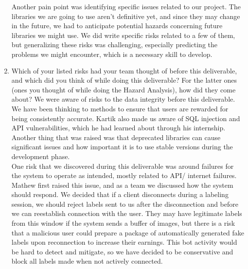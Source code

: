 \documentclass{article}
\begin{document}
\begin{enumerate}
    Another pain point was identifying specific issues related to our project. The libraries we are going to use aren’t definitive yet, and since they may change in the future, 
    we had to anticipate potential hazards concerning future libraries we might use. We did write specific risks related to a few of them, 
    but generalizing these risks was challenging, especially predicting the problems we might encounter, which is a necessary skill to develop.
    

    \item Which of your listed risks had your team thought of before this
    deliverable, and which did you think of while doing this deliverable? For
    the latter ones (ones you thought of while doing the Hazard Analysis), how
    did they come about?
    We were aware of risks to the data integrity before this deliverable. We have been thinking to methods to ensure that users are rewarded for being consistently accurate. Kartik also 
    made us aware of SQL injection and API vulnerabilities, which he had learned about through his internship. Another thing that was raised was that deprecated libraries can cause significant 
    issues and how important it is to use stable versions during the development phase.\\
    One risk that we discovered during this deliverable was around failures for the system to operate as intended, mostly related to API/ internet failures. Mathew first raised this issue, and
    as a team we discussed how the system should respond. We decided that if a client disconnects during a labeling session, we should reject labels sent to us after the disconnection and before
    we can reestablish connection with the user. They may have legitimate labels from this window if the system sends a buffer of images, but there is a risk that a malicious user could prepare 
    a package of automatically generated fake labels upon reconnection to increase their earnings. This bot activity would be hard to detect and mitigate, so we have decided to be conservative and block all labels
    made when not actively connected.


\end{enumerate}
\end{document}
